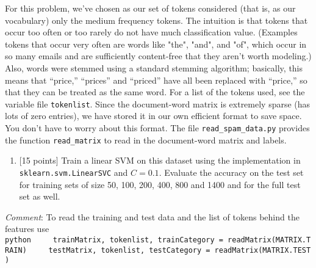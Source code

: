 \documentclass[11pt]{article}
\providecommand{\tightlist}{%
      \setlength{\itemsep}{0pt}\setlength{\parskip}{0pt}}
\begin{document}
For this problem, we've chosen as our set of tokens considered (that is,
as our vocabulary) only the medium frequency tokens. The intuition is
that tokens that occur too often or too rarely do not have much
classification value. (Examples tokens that occur very often are words
like "the", "and", and "of", which occur in so many emails and are
sufficiently content-free that they aren't worth modeling.) Also, words
were stemmed using a standard stemming algorithm; basically, this means
that ``price,'' ``prices'' and ``priced'' have all been replaced with
``price,'' so that they can be treated as the same word. For a list of
the tokens used, see the variable file \texttt{tokenlist}. Since the
document-word matrix is extremely sparse (has lots of zero entries), we
have stored it in our own efficient format to save space. You don't have
to worry about this format. The file \texttt{read\_spam\_data.py}
provides the function \texttt{read\_matrix} to read in the document-word
matrix and labels.

\begin{enumerate}
\def\labelenumi{\alph{enumi})}
\tightlist
\item
  {[}15 points{]} Train a linear SVM on this dataset using the
  implementation in \texttt{sklearn.svm.LinearSVC} and \(C=0.1\).
  Evaluate the accuracy on the test set for training sets of size 50,
  100, 200, 400, 800 and 1400 and for the full test set as well.
\end{enumerate}

\emph{Comment}: To read the training and test data and the list of
tokens behind the features use
\texttt{python\ \ \ \ \ trainMatrix,\ tokenlist,\ trainCategory\ =\ readMatrix(\textquotesingle{}MATRIX.TRAIN\textquotesingle{})\ \ \ \ \ testMatrix,\ tokenlist,\ testCategory\ =\ readMatrix(\textquotesingle{}MATRIX.TEST\textquotesingle{})}
\end{document}
